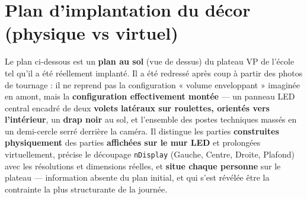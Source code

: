 \documentclass[11pt,a4paper]{report}
\begin{document}
\section{Plan d'implantation du décor (physique vs virtuel)}
\label{sec:implantation}
Le plan ci-dessous est un \textbf{plan au sol} (vue de dessus) du plateau VP de l'école tel qu'il a
été réellement implanté. Il a été redressé après coup à partir des photos de tournage : il ne
reprend pas la configuration « volume enveloppant » imaginée en amont, mais la
\textbf{configuration effectivement montée} --- un panneau LED central encadré de deux
\textbf{volets latéraux sur roulettes, orientés vers l'intérieur}, un \textbf{drap noir} au sol, et
l'ensemble des postes techniques massés en un demi-cercle serré derrière la caméra. Il distingue
les parties \textbf{construites physiquement} des parties \textbf{affichées sur le mur LED} et
prolongées virtuellement, précise le découpage \texttt{nDisplay} (Gauche, Centre, Droite,
Plafond) avec les résolutions et dimensions réelles, et \textbf{situe chaque personne} sur le
plateau --- information absente du plan initial, et qui s'est révélée être la contrainte la plus
structurante de la journée.
\end{document}
